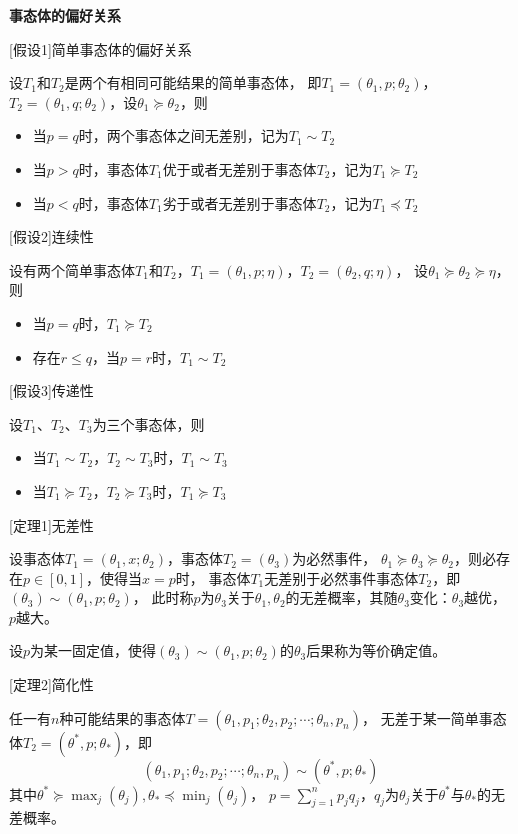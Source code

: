 \documentclass[a4paper,12pt]{article}
\begin{document}
\noindent
\textbf{事态体的偏好关系}

[假设1]简单事态体的偏好关系

设$T_1$和$T_2$是两个有相同可能结果的简单事态体，
即$T_1=\left(\theta_1,p;\theta_2\right)$，$T_2=\left(\theta_1,q;\theta_2\right)$，设$\theta_1 \succeq \theta_2$，则
\begin{itemize}[itemsep=0pt,parsep=0pt]
    \item 当$p=q$时，两个事态体之间无差别，记为$T_1 \sim T_2$
    \item 当$p>q$时，事态体$T_1$优于或者无差别于事态体$T_2$，记为$T_1\succeq T_2$
    \item 当$p<q$时，事态体$T_1$劣于或者无差别于事态体$T_2$，记为$T_1\preceq T_2$
\end{itemize} 

[假设2]连续性

设有两个简单事态体$T_1$和$T_2$，$T_1=\left(\theta_1,p;\eta\right)$，$T_2=\left(\theta_2,q;\eta\right)$，
设$\theta_1 \succeq \theta_2 \succeq \eta$，则
\begin{itemize}[itemsep=0pt,parsep=0pt]
    \item 当$p=q$时，$T_1 \succeq T_2$
    \item 存在$r\le q$，当$p=r$时，$T_1\sim T_2$
\end{itemize} 

[假设3]传递性

设$T_1$、$T_2$、$T_3$为三个事态体，则
\begin{itemize}[itemsep=0pt,parsep=0pt]
    \item 当$T_1\sim T_2$，$T_2\sim T_3$时，$T_1\sim T_3$
    \item 当$T_1 \succeq T_2$，$T_2 \succeq T_3$时，$T_1 \succeq T_3$
\end{itemize}

[定理1]无差性

设事态体$T_1=\left(\theta_1,x;\theta_2\right)$，事态体$T_2=\left(\theta_3\right)$为必然事件，
$\theta_1\succeq\theta_3\succeq\theta_2$，则必存在$p\in\left[0,1\right]$，使得当$x=p$时，
事态体$T_1$无差别于必然事件事态体$T_2$，即$\left(\theta_3\right)\sim\left(\theta_1,p;\theta_2\right)$，
此时称$p$为$\theta_3$关于$\theta_1,\theta_2$的无差概率，其随$\theta_3$变化：$\theta_3$越优，$p$越大。

设$p$为某一固定值，使得$\left(\theta_3\right)\sim\left(\theta_1,p;\theta_2\right)$的$\theta_3$后果称为等价确定值。

[定理2]简化性

任一有$n$种可能结果的事态体$T=\left(\theta_1,p_1;\theta_2,p_2;\cdots;\theta_n,p_n\right)$，
无差于某一简单事态体$T_2=\left(\theta^*,p;\theta_*\right)$，即
$$
\left(\theta_1,p_1;\theta_2,p_2;\cdots;\theta_n,p_n\right)\sim\left(\theta^*,p;\theta_*\right)
$$
其中$\theta^*\succeq\max_j\left(\theta_j\right),\theta_*\preceq\min_j\left(\theta_j\right)$，
$p=\sum_{j=1}^np_jq_j$，$q_j$为$\theta_j$关于$\theta^*$与$\theta_*$的无差概率。
\end{document}
